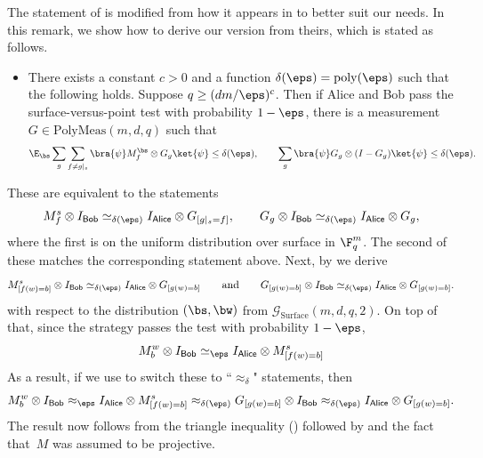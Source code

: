 \documentclass[11pt]{article}
\newcommand{\consistency}{\simeq}
\newcommand{\polymeas}[3]{\mathrm{PolyMeas}(#1,#2,#3)}
\newcommand{\game}{\mathscr{G}}
\newcommand{\reg}[1]{{\mathsf{#1}}}
\begin{document}
\begin{remark}
The statement of  is modified from how it appears in \cite[Theorem 2]{NV18b} to better suit our needs.
In this remark, we show how to derive our version from theirs,
which is stated as follows.
\begin{itemize}
\item[$\circ$] There exists a constant $c >0$ and a function $\delta(\eps) = \mathrm{poly}(\eps)$ such that the following holds.
		Suppose $q \geq (dm/\eps)^c$. Then if Alice and Bob pass the surface-versus-point test with probability $1-\eps$, there is a measurement $G \in \polymeas{m}{d}{q}$
		such that
		\begin{equation}\label{eq:what-anand-and-thomas-proved}
		\E_{\bs} \sum_g \sum_{f \neq g|_s} \bra{\psi} M^{\bs}_f \otimes G_g \ket{\psi} \leq \delta(\eps),\qquad
		\sum_g \bra{\psi} G_g \otimes (I - G_g) \ket{\psi} \leq \delta(\eps).
		\end{equation}
\end{itemize}
These are equivalent to the statements
\begin{equation*}
M^s_f \otimes I_{\reg{Bob}} \consistency_{\delta(\eps)} I_{\reg{Alice}} \otimes G_{[g|_s=f]},
\qquad
G_g \otimes I_{\reg{Bob}} \consistency_{\delta(\eps)} I_{\reg{Alice}} \otimes G_g,
\end{equation*}
where the first is on the uniform distribution over surface in $\F_q^m$.
The second of these matches the corresponding statement above.
Next, by  we derive
\begin{equation*}
M^s_{[f(w) = b]} \otimes I_{\reg{Bob}} \consistency_{\delta(\eps)} I_{\reg{Alice}} \otimes G_{[g(w)=b]}
\qquad
\text{and}
\qquad
G_{[g(w) = b]} \otimes I_{\reg{Bob}} \consistency_{\delta(\eps)} I_{\reg{Alice}} \otimes G_{[g(w) = b]}.
\end{equation*}
with respect to the distribution $(\bs, \bw)$ from $\game_{\mathrm{Surface}}(m,d,q,2)$.
On top of that, since the strategy passes the test with probability $1-\eps$,
\begin{equation*}
M^w_b \otimes I_{\reg{Bob}} \consistency_{\eps} I_{\reg{Alice}} \otimes M^s_{[f(w) = b]}
\end{equation*}
As a result, if we use  to switch these to ``$\approx_\delta$" statements, then
\begin{equation*}
M^w_b \otimes I_{\reg{Bob}}
\approx_{\eps} I_{\reg{Alice}} \otimes M^s_{[f(w) = b]}
\approx_{\delta(\eps)} G_{[g(w)=b]} \otimes  I_{\reg{Bob}} 
\approx_{\delta(\eps)} I_{\reg{Alice}} \otimes G_{[g(w) = b]}.
\end{equation*}
The result now follows from the triangle inequality () followed by  and the fact that~$M$ was assumed to be projective.


\end{remark}
\end{document}
